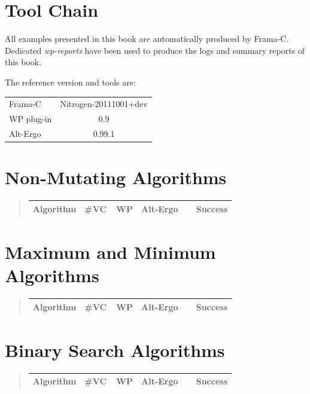 \section{Tool Chain}

All examples presented in this book are automatically produced by
\textsf{Frama-C}. Dedicated \textit{wp-reports} have been used to
produce the logs and summary reports of this book.

The reference version and tools are:
\begin{center}
  \begin{tabular}{lc}
    \hline
    \textsf{Frama-C} & Nitrogen-20111001+dev \\
    \textsf{WP} plug-in & 0.9 \\
    \textsf{Alt-Ergo} & 0.99.1 \\
    \hline
  \end{tabular}
\end{center}

\newpage

\newenvironment{summary}%
{\begin{quote}\begin{tabular}{lcccl}
  Algorithm & \#VC\, & \textsf{WP} & \textsf{Alt-Ergo} & ~~Success \\
  \hline
}{\end{tabular}\end{quote}}

\section{Non-Mutating Algorithms}
\begin{summary}
  
  
  
  
  
  
  
  
\end{summary}

\section{Maximum and Minimum Algorithms}
\begin{summary}
  
  
  
  
  
\end{summary}

\section{Binary Search Algorithms}
\begin{summary}
  
  
  
\end{summary}

